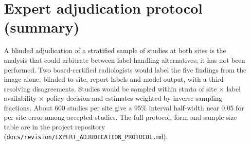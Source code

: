 \documentclass[10pt,a4paper]{article}
\begin{document}
\section{Expert adjudication protocol (summary)}\label{ssec:adjud}
A blinded adjudication of a stratified sample of studies at both sites is the
analysis that could arbitrate between label-handling alternatives; it has not
been performed. Two board-certified radiologists would label the five findings
from the image alone, blinded to site, report labels and model output, with a
third resolving disagreements. Studies would be sampled within strata of
site $\times$ label availability $\times$ policy decision and estimates weighted
by inverse sampling fractions. About 600 studies per site give a 95\% interval
half-width near 0.05 for per-site error among accepted studies. The full
protocol, form and sample-size table are in the project repository
(\texttt{docs/revision/EXPERT\_ADJUDICATION\_PROTOCOL.md}).
\end{document}

